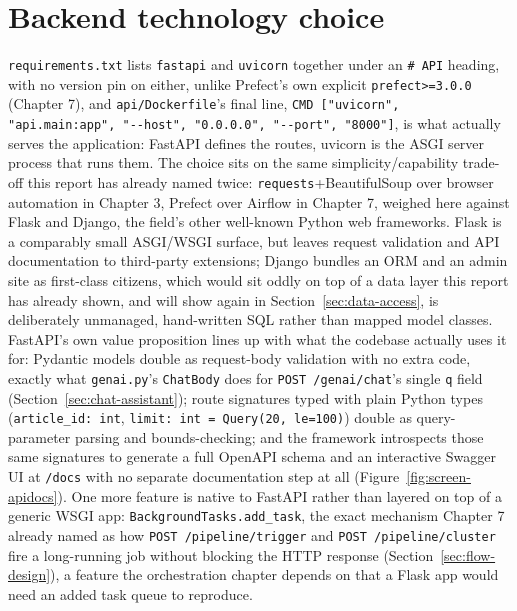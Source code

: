 \section{Backend technology choice}
\label{sec:backend-choice}
\begin{sloppypar}
\texttt{requirements.txt} lists \texttt{fastapi} and \texttt{uvicorn} together under an \texttt{\# API} heading, with no version pin on either, unlike Prefect's own explicit \texttt{prefect>=3.0.0} (Chapter 7), and \texttt{api/\allowbreak Dockerfile}'s final line, \texttt{CMD ["uvicorn", "api.main:app", "-{}-host", "0.0.0.0", "-{}-port", "8000"]}, is what actually serves the application: FastAPI defines the routes, uvicorn is the ASGI server process that runs them. The choice sits on the same simplicity/capability trade-off this report has already named twice: \texttt{requests}+BeautifulSoup over browser automation in Chapter 3, Prefect over Airflow in Chapter 7, weighed here against Flask and Django, the field's other well-known Python web frameworks. Flask is a comparably small ASGI/WSGI surface, but leaves request validation and API documentation to third-party extensions; Django bundles an ORM and an admin site as first-class citizens, which would sit oddly on top of a data layer this report has already shown, and will show again in Section~\ref{sec:data-access}, is deliberately unmanaged, hand-written SQL rather than mapped model classes. FastAPI's own value proposition lines up with what the codebase actually uses it for: Pydantic models double as request-body validation with no extra code, exactly what \texttt{genai.py}'s \texttt{ChatBody} does for \texttt{POST /genai/chat}'s single \texttt{q} field (Section~\ref{sec:chat-assistant}); route signatures typed with plain Python types (\texttt{article\_id: int}, \texttt{limit: int = Query(20, le=100)}) double as query-parameter parsing and bounds-checking; and the framework introspects those same signatures to generate a full OpenAPI schema and an interactive Swagger UI at \texttt{/docs} with no separate documentation step at all (Figure~\ref{fig:screen-apidocs}). One more feature is native to FastAPI rather than layered on top of a generic WSGI app: \texttt{BackgroundTasks.\allowbreak add\_task}, the exact mechanism Chapter 7 already named as how \texttt{POST /pipeline/trigger} and \texttt{POST /pipeline/cluster} fire a long-running job without blocking the HTTP response (Section~\ref{sec:flow-design}), a feature the orchestration chapter depends on that a Flask app would need an added task queue to reproduce.
\end{sloppypar}


